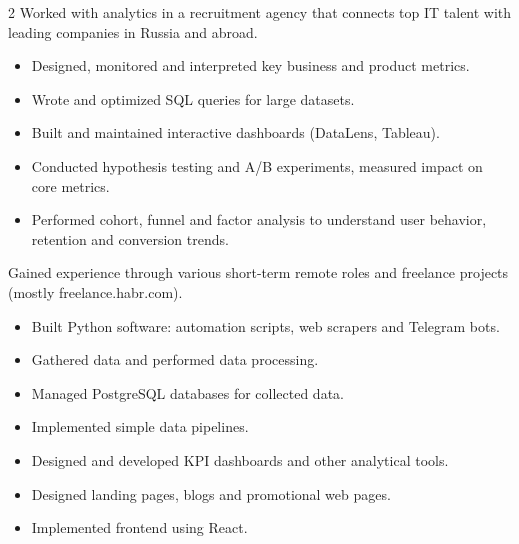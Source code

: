 \documentclass[10pt,a4paper,withhyper,normalphoto]{altacv}
\begin{document}
\begin{paracol}{2}
Worked with analytics in a recruitment agency that connects top IT talent with leading companies in Russia and abroad.
\medskip
\begin{itemize}
\item Designed, monitored and interpreted key business and product metrics.
\item Wrote and optimized SQL queries for large datasets.
\item Built and maintained interactive dashboards (DataLens, Tableau).
\item Conducted hypothesis testing and A/B experiments, measured impact on core metrics.
\item Performed cohort, funnel and factor analysis to understand user behavior, retention and conversion trends.
\end{itemize}

Gained experience through various short-term remote roles and freelance projects (mostly freelance.habr.com).
\medskip
\begin{itemize}
\item Built Python software: automation scripts, web scrapers and Telegram bots.
\item Gathered data and performed data processing.
\item Managed PostgreSQL databases for collected data.
\item Implemented simple data pipelines.
\item Designed and developed KPI dashboards and other analytical tools.
\item Designed landing pages, blogs and promotional web pages.
\item Implemented frontend using React.
\end{itemize}

\switchcolumn


\medskip



\end{paracol}
\end{document}
